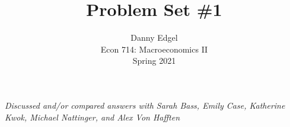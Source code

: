 \documentclass{article}
\begin{document}
\title{	Problem Set \#1 }
\author{ 	Danny Edgel 					\\ 
			Econ 714: Macroeconomics II		\\
			Spring 2021						\\
		}
\maketitle\thispagestyle{empty}


\noindent\textit{Discussed and/or compared answers with Sarah Bass, Emily Case, Katherine Kwok, Michael Nattinger, and Alex Von Hafften}

\end{document}
